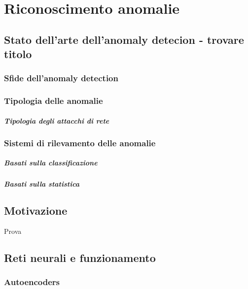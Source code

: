 \chapter{Riconoscimento anomalie}


\section{Stato dell'arte dell'anomaly detecion - trovare titolo}

\subsection{Sfide dell'anomaly detection}

\subsection{Tipologia delle anomalie}
\paragraph{Tipologia degli attacchi di rete}
\subsection{Sistemi di rilevamento delle anomalie}
\paragraph{Basati sulla classificazione}
\paragraph{Basati sulla statistica}

\section{Motivazione}
Prova 


\section{Reti neurali e funzionamento}



\subsection{Autoencoders}




